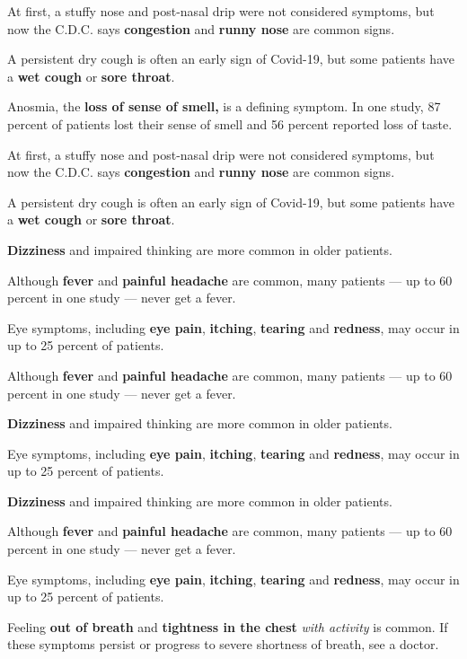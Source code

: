 At first, a stuffy nose and post-nasal drip were not considered
symptoms, but now the C.D.C. says \textbf{congestion} and \textbf{runny
nose} are common signs.

A persistent dry cough is often an early sign of Covid-19, but some
patients have a \textbf{wet cough} or \textbf{sore throat}.

Anosmia, the \textbf{loss of sense of smell,} is a defining symptom. In
one study, 87 percent of patients lost their sense of smell and 56
percent reported loss of taste.

At first, a stuffy nose and post-nasal drip were not considered
symptoms, but now the C.D.C. says \textbf{congestion} and \textbf{runny
nose} are common signs.

A persistent dry cough is often an early sign of Covid-19, but some
patients have a \textbf{wet cough} or \textbf{sore throat}.

\textbf{Dizziness} and impaired thinking are more common in older
patients.

Although \textbf{fever} and \textbf{painful headache} are common, many
patients --- up to 60 percent in one study --- never get a fever.

Eye symptoms, including \textbf{eye pain}, \textbf{itching},
\textbf{tearing} and \textbf{redness}, may occur in up to 25 percent of
patients.

Although \textbf{fever} and \textbf{painful headache} are common, many
patients --- up to 60 percent in one study --- never get a fever.

\textbf{Dizziness} and impaired thinking are more common in older
patients.

Eye symptoms, including \textbf{eye pain}, \textbf{itching},
\textbf{tearing} and \textbf{redness}, may occur in up to 25 percent of
patients.

\textbf{Dizziness} and impaired thinking are more common in older
patients.

Although \textbf{fever} and \textbf{painful headache} are common, many
patients --- up to 60 percent in one study --- never get a fever.

Eye symptoms, including \textbf{eye pain}, \textbf{itching},
\textbf{tearing} and \textbf{redness}, may occur in up to 25 percent of
patients.

Feeling \textbf{out of breath} and \textbf{tightness in the chest}
\emph{with activity} is common. If these symptoms persist or progress to
severe shortness of breath, see a doctor.

